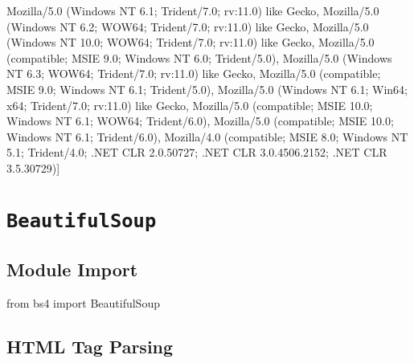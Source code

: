 \documentclass[
]{book}
\newenvironment{Shaded}{\begin{snugshade}}{\end{snugshade}}
\newcommand{\ImportTok}[1]{#1}
\newcommand{\NormalTok}[1]{#1}
\newcommand{\StringTok}[1]{\textcolor[rgb]{0.5,0.5,0.5}{#1}}
\begin{document}
\begin{Shaded}
\begin{Highlighting}[]
    \StringTok{\textquotesingle{}Mozilla/5.0 (Windows NT 6.1; Trident/7.0; rv:11.0) like Gecko\textquotesingle{}}\NormalTok{,}
    \StringTok{\textquotesingle{}Mozilla/5.0 (Windows NT 6.2; WOW64; Trident/7.0; rv:11.0) like Gecko\textquotesingle{}}\NormalTok{,}
    \StringTok{\textquotesingle{}Mozilla/5.0 (Windows NT 10.0; WOW64; Trident/7.0; rv:11.0) like Gecko\textquotesingle{}}\NormalTok{,}
    \StringTok{\textquotesingle{}Mozilla/5.0 (compatible; MSIE 9.0; Windows NT 6.0; Trident/5.0)\textquotesingle{}}\NormalTok{,}
    \StringTok{\textquotesingle{}Mozilla/5.0 (Windows NT 6.3; WOW64; Trident/7.0; rv:11.0) like Gecko\textquotesingle{}}\NormalTok{,}
    \StringTok{\textquotesingle{}Mozilla/5.0 (compatible; MSIE 9.0; Windows NT 6.1; Trident/5.0)\textquotesingle{}}\NormalTok{,}
    \StringTok{\textquotesingle{}Mozilla/5.0 (Windows NT 6.1; Win64; x64; Trident/7.0; rv:11.0) like Gecko\textquotesingle{}}\NormalTok{,}
    \StringTok{\textquotesingle{}Mozilla/5.0 (compatible; MSIE 10.0; Windows NT 6.1; WOW64; Trident/6.0)\textquotesingle{}}\NormalTok{,}
    \StringTok{\textquotesingle{}Mozilla/5.0 (compatible; MSIE 10.0; Windows NT 6.1; Trident/6.0)\textquotesingle{}}\NormalTok{,}
    \StringTok{\textquotesingle{}Mozilla/4.0 (compatible; MSIE 8.0; Windows NT 5.1; Trident/4.0; .NET CLR 2.0.50727; .NET CLR 3.0.4506.2152; .NET CLR 3.5.30729)\textquotesingle{}}\NormalTok{]}
\end{Highlighting}
\end{Shaded}

\hypertarget{beautifulsoup}{%
\section{\texorpdfstring{\texttt{BeautifulSoup}}{BeautifulSoup}}\label{beautifulsoup}}

\hypertarget{module-import-2}{%
\subsection{Module Import}\label{module-import-2}}

\begin{Shaded}
\begin{Highlighting}[]
\ImportTok{from}\NormalTok{ bs4 }\ImportTok{import}\NormalTok{ BeautifulSoup}
\end{Highlighting}
\end{Shaded}

\hypertarget{html-tag-parsing}{%
\subsection{HTML Tag Parsing}\label{html-tag-parsing}}
\end{document}
